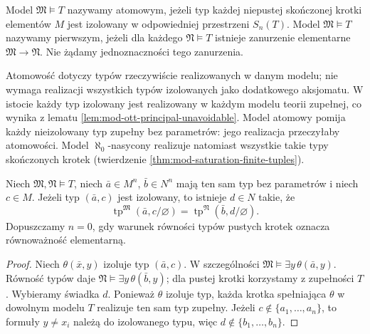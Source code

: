 \begin{definicja}
\label{def:mod-atomic-prime}
Model $\mathfrak M\models T$ nazywamy atomowym,
jeżeli typ każdej niepustej skończonej krotki
elementów $M$ jest izolowany w odpowiedniej
przestrzeni $S_n(T)$.
Model $\mathfrak M\models T$ nazywamy pierwszym,
jeżeli dla każdego $\mathfrak N\models T$
istnieje zanurzenie elementarne
$\mathfrak M\to\mathfrak N$.
Nie żądamy jednoznaczności tego zanurzenia.
\end{definicja}

Atomowość dotyczy typów rzeczywiście realizowanych
w danym modelu; nie wymaga realizacji wszystkich
typów izolowanych jako dodatkowego aksjomatu.
W istocie każdy typ izolowany jest realizowany
w każdym modelu teorii zupełnej, co wynika
z lematu \ref{lem:mod-ott-principal-unavoidable}.
Model atomowy pomija każdy nieizolowany typ
zupełny bez parametrów: jego realizacja przeczyłaby
atomowości. Model $\aleph_0$-nasycony realizuje
natomiast wszystkie takie typy skończonych krotek
(twierdzenie \ref{thm:mod-saturation-finite-tuples}).

\begin{lemat}
\label{lem:mod-atomic-extension}
Niech $\mathfrak M,\mathfrak N\models T$,
niech $\bar a\in M^n$, $\bar b\in N^n$ mają
ten sam typ bez parametrów i niech $c\in M$.
Jeżeli typ $(\bar a,c)$ jest izolowany,
to istnieje $d\in N$ takie, że
\[
\operatorname{tp}^{\mathfrak M}(\bar a,c/\varnothing)
=
\operatorname{tp}^{\mathfrak N}(\bar b,d/\varnothing).
\]
Dopuszczamy $n=0$, gdy warunek równości typów
pustych krotek oznacza równoważność elementarną.
\end{lemat}
\begin{proof}
Niech $\theta(\bar x,y)$ izoluje typ $(\bar a,c)$.
W szczególności
$\mathfrak M\models\exists y\,\theta(\bar a,y)$.
Równość typów daje
$\mathfrak N\models\exists y\,\theta(\bar b,y)$;
dla pustej krotki korzystamy z zupełności $T$.
Wybieramy świadka $d$.
Ponieważ $\theta$ izoluje typ, każda krotka
spełniająca $\theta$ w dowolnym modelu $T$
realizuje ten sam typ zupełny.
Jeżeli $c\notin\{a_1,\ldots,a_n\}$, to formuły
$y\ne x_i$ należą do izolowanego typu, więc
$d\notin\{b_1,\ldots,b_n\}$.
\end{proof}

